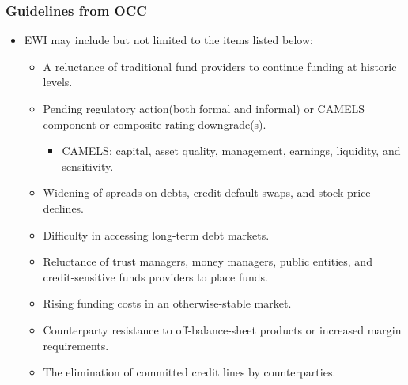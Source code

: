 \subsubsection{Guidelines from OCC}
\begin{itemize}
\item EWI may include but not limited to the items listed below:
    \begin{itemize}
    \item A reluctance of traditional fund providers to continue funding at historic levels.
    \item Pending regulatory action(both formal and informal) or CAMELS component or composite rating downgrade(s).
        \begin{itemize}
        \item CAMELS: capital, asset quality, management, earnings, liquidity, and sensitivity.
        \end{itemize}
    \item Widening of spreads on debts, credit default swaps, and stock price declines.
    \item Difficulty in accessing long-term debt markets.
    \item Reluctance of trust managers, money managers, public entities, and credit-sensitive funds providers to place funds.
    \item Rising funding costs in an otherwise-stable market.
    \item Counterparty resistance to off-balance-sheet products or increased margin requirements.
    \item The elimination of committed credit lines by counterparties.
    \end{itemize}
\end{itemize}



